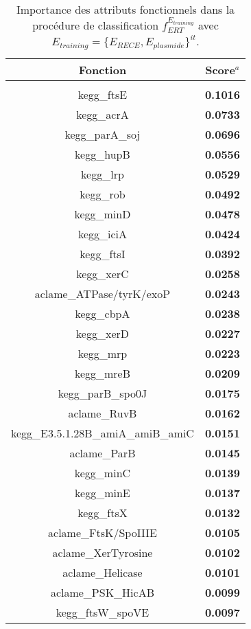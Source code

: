 \begin{table}[H]
	\begin{minipage}{\textwidth}
	\caption[Importance des attributs fonctionnels des observations de $E_{training}$ dans la classification RECE/plasmide]{Importance des attributs fonctionnels dans la procédure de classification $f_{ERT}^{E_{training}}$ avec $E_{training}=\{E_{RECE},E_{plasmide}\}^{it}$. }\label{tabvarimportance}
	\end{minipage}
\hspace*{-2cm}
\begin{minipage}[t]{0.3\textwidth}
\vspace{0cm}
\centering
\begin{scriptsize}
\begin{tabular}{c>{\bfseries}c}
Fonction & Score$^{a}$\\
\hline
\\[-0.2cm]
kegg\_ftsE&0.1016\\
kegg\_acrA&0.0733\\
kegg\_parA\_soj&0.0696\\
kegg\_hupB&0.0556\\
kegg\_lrp&0.0529\\
kegg\_rob&0.0492\\
kegg\_minD&0.0478\\
kegg\_iciA&0.0424\\
kegg\_ftsI&0.0392\\
kegg\_xerC&0.0258\\
aclame\_ATPase/tyrK/exoP&0.0243\\
kegg\_cbpA&0.0238\\
kegg\_xerD&0.0227\\
kegg\_mrp&0.0223\\
kegg\_mreB&0.0209\\
kegg\_parB\_spo0J&0.0175\\
aclame\_RuvB&0.0162\\
kegg\_E3.5.1.28B\_amiA\_amiB\_amiC&0.0151\\
aclame\_ParB&0.0145\\
kegg\_minC&0.0139\\
kegg\_minE&0.0137\\
kegg\_ftsX&0.0132\\
aclame\_FtsK/SpoIIIE&0.0105\\
aclame\_XerTyrosine&0.0102\\
aclame\_Helicase&0.0101\\
aclame\_PSK\_HicAB&0.0099\\
kegg\_ftsW\_spoVE&0.0097\\

\end{tabular}
\end{scriptsize}
\end{minipage}
\end{table}
